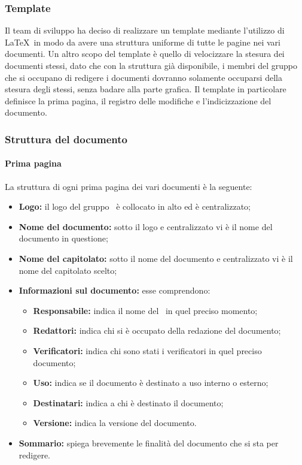 \subsubsection{Template}
Il team di sviluppo ha deciso di realizzare un template mediante l'utilizzo di \LaTeX\ in modo da avere una struttura uniforme di tutte le pagine nei vari documenti.
Un altro scopo del template è quello di velocizzare la stesura dei documenti stessi, dato che con la struttura già disponibile, i membri del gruppo che si occupano di redigere i documenti dovranno solamente occuparsi della stesura degli stessi, senza badare alla parte grafica.
Il template in particolare definisce la prima pagina, il registro delle modifiche e l'indicizzazione del documento.
\subsubsection{Struttura del documento}
\paragraph{Prima pagina}
La struttura di ogni prima pagina dei vari documenti è la seguente:
\begin {itemize}
    \item \textbf{Logo:} il logo del gruppo \groupName\ è collocato in alto ed è centralizzato;
    \item \textbf{Nome del documento:} sotto il logo e centralizzato vi è il nome del documento in questione;
    \item \textbf{Nome del capitolato:} sotto il nome del documento e centralizzato vi è il nome del capitolato scelto;
    \item \textbf{Informazioni sul documento:} esse comprendono:
        \begin{itemize}
            \item \textbf{Responsabile:} indica il nome del \roleProjectManager\ in quel preciso momento;
            \item \textbf{Redattori:} indica chi si è occupato della redazione del documento;
            \item \textbf{Verificatori: }indica chi sono stati i verificatori in quel preciso documento;
            \item \textbf{Uso:} indica se il documento è destinato a uso interno o esterno;
            \item \textbf{Destinatari:} indica a chi è destinato il documento;
            \item \textbf{Versione:} indica la versione del documento. 
        \end{itemize}
    \item \textbf{Sommario:} spiega brevemente le finalità del documento che si sta per redigere.        
\end {itemize}
